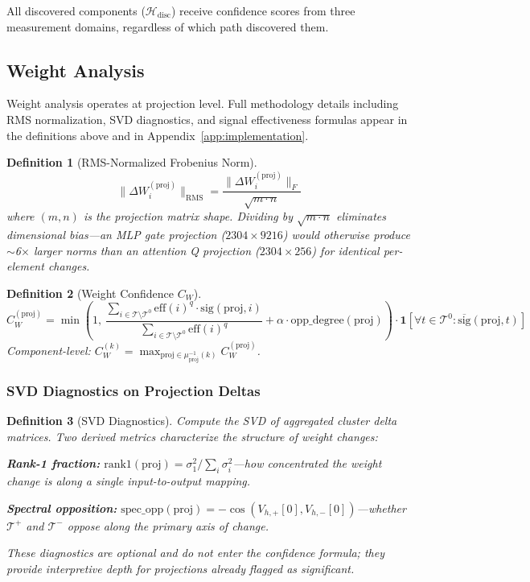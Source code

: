 \documentclass[11pt]{article}
\newtheorem{definition}{Definition}[section]
\begin{document}
All discovered components ($\mathcal{H}_{\text{disc}}$) receive confidence scores from three measurement domains, regardless of which path discovered them.

\subsection{Weight Analysis}

Weight analysis operates at projection level. Full methodology details including RMS normalization, SVD diagnostics, and signal effectiveness formulas appear in the definitions above and in Appendix~\ref{app:implementation}.

\begin{definition}[RMS-Normalized Frobenius Norm]
\begin{equation}
\|\Delta W_i^{(\text{proj})}\|_{\text{RMS}} = \frac{\|\Delta W_i^{(\text{proj})}\|_F}{\sqrt{m \cdot n}}
\end{equation}
where $(m, n)$ is the projection matrix shape. Dividing by $\sqrt{m \cdot n}$ eliminates dimensional bias---an MLP gate projection ($2304 \times 9216$) would otherwise produce $\sim$6$\times$ larger norms than an attention Q projection ($2304 \times 256$) for identical per-element changes.
\end{definition}

\begin{definition}[Weight Confidence $C_W$]
\begin{equation}
C^{(\text{proj})}_W = \min\left(1,\, \frac{\sum_{i \in \mathcal{T} \setminus \mathcal{T}^0} \text{eff}(i)^q \cdot \text{sig}(\text{proj}, i)}{\sum_{i \in \mathcal{T} \setminus \mathcal{T}^0} \text{eff}(i)^q} + \alpha \cdot \text{opp\_degree}(\text{proj})\right) \cdot \mathbf{1}\left[\forall t \in \mathcal{T}^0: \overline{\text{sig}}(\text{proj}, t)\right]
\end{equation}
Component-level: $C^{(k)}_W = \max_{\text{proj} \in \mu_{\text{proj}}^{-1}(k)} C^{(\text{proj})}_W$.
\end{definition}

\subsubsection{SVD Diagnostics on Projection Deltas}

\begin{definition}[SVD Diagnostics]
Compute the SVD of aggregated cluster delta matrices. Two derived metrics characterize the structure of weight changes:

\textbf{Rank-1 fraction:} $\text{rank1}(\text{proj}) = \sigma_1^2 / \sum_i \sigma_i^2$---how concentrated the weight change is along a single input-to-output mapping.

\textbf{Spectral opposition:} $\text{spec\_opp}(\text{proj}) = -\cos(V_{h,+}[0], V_{h,-}[0])$---whether $\mathcal{T}^+$ and $\mathcal{T}^-$ oppose along the primary axis of change.

These diagnostics are optional and do not enter the confidence formula; they provide interpretive depth for projections already flagged as significant.
\end{definition}
\end{document}
